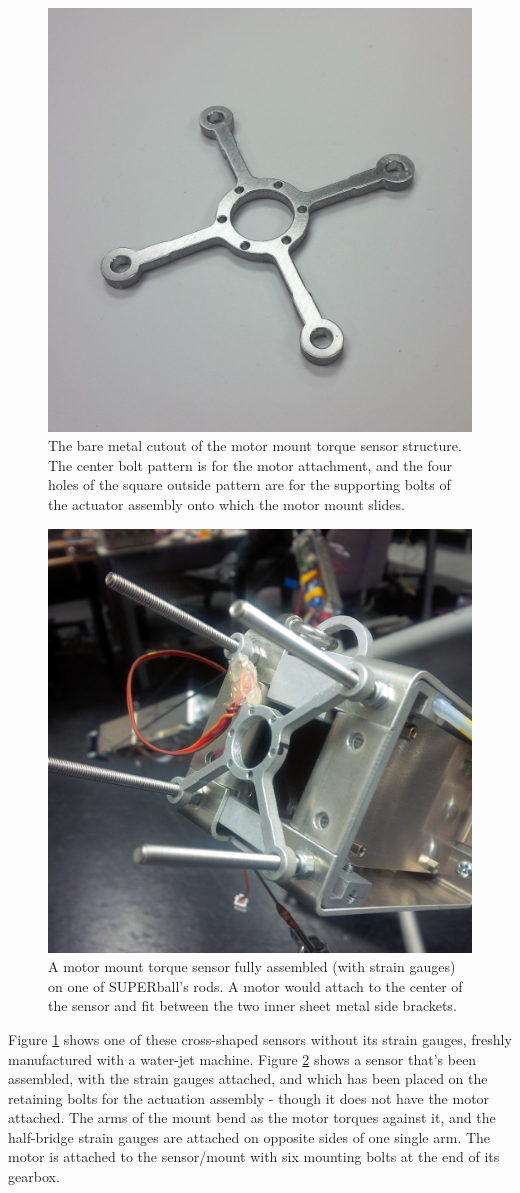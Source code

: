 \documentclass[12pt]{report}
\begin{document}
\begin{figure}[thpb]
      \centering
      \includegraphics[width=.5\columnwidth]{img/motor_mount_torque_sensor.jpg}
      \caption{The bare metal cutout of the motor mount torque sensor structure. The center bolt pattern is for the motor attachment, and the four holes of the square outside pattern are for the supporting bolts of the actuator assembly onto which the motor mount slides.}
      \label{fig:motor_mount_torque_sensor}
      \vspace{-0.2cm}
\end{figure}

\begin{figure}[thpb]
      \centering
      \includegraphics[width=.5\columnwidth]{img/sensor_onrod.jpg}
      \caption{A motor mount torque sensor fully assembled (with strain gauges) on one of SUPERball's rods. A motor would attach to the center of the sensor and fit between the two inner sheet metal side brackets.}
      \label{fig:motor_mount_torque_sensor_assembled}
      \vspace{-0.2cm}
\end{figure}

Figure \ref{fig:motor_mount_torque_sensor} shows one of these cross-shaped sensors without its strain gauges, freshly manufactured with a water-jet machine.
Figure \ref{fig:motor_mount_torque_sensor_assembled} shows a sensor that's been assembled, with the strain gauges attached, and which has been placed on the retaining bolts for the actuation assembly - though it does not have the motor attached.
The arms of the mount bend as the motor torques against it, and the half-bridge strain gauges are attached on opposite sides of one single arm. 
The motor is attached to the sensor/mount with six mounting bolts at the end of its gearbox.
\end{document}
